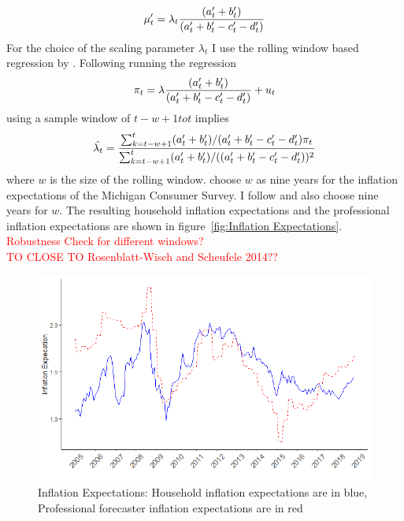 \documentclass[review]{elsarticle}
\begin{document}
\begin{align*}
\mu_t\sp{\prime} = \lambda_t \frac{(a_t\sp{\prime} + b_t\sp{\prime})}{(a_t\sp{\prime} + b_t\sp{\prime} - c_t\sp{\prime} - d_t\sp{\prime})}
\end{align*}
For the choice of the scaling parameter $\lambda_t$ I use the rolling window based regression by \cite{Lahiri2015}. Following \cite{Rosenblatt-Wisch2015} running the regression
\begin{align*}
\pi_t = \lambda \frac{(a_t\sp{\prime} + b_t\sp{\prime})}{(a_t\sp{\prime} + b_t\sp{\prime} - c_t\sp{\prime} - d_t\sp{\prime})} + u_t 
\end{align*}
using a sample window of $t - w + 1 to t$ implies
\begin{align*}
\hat{\lambda_t} = \frac{\sum^t_{k = t-w+1}(a_t\sp{\prime} + b_t\sp{\prime})/(a_t\sp{\prime} + b_t\sp{\prime} - c_t\sp{\prime} - d_t\sp{\prime})\pi_t}{\sum^t_{k = t-w+1}(a_t\sp{\prime} + b_t\sp{\prime})/((a_t\sp{\prime} + b_t\sp{\prime} - c_t\sp{\prime} - d_t\sp{\prime}))^2}
\end{align*}
where $w$ is the size of the rolling window. \cite{Lahiri2015} choose $w$ as nine years for the inflation expectations of the Michigan Consumer Survey. I follow \cite{Lahiri2015} and also choose nine years for $w$. The resulting household inflation expectations and the professional inflation expectations are shown in figure~\ref{fig:Inflation Expectations}.
\\
\textcolor{red}{Robustness Check for different windows?}
\\
\textcolor{red}{TO CLOSE TO Rosenblatt-Wisch and Scheufele 2014??}

  \begin{figure}[!ht]
    \centering
    \includegraphics{household_prof_inf.png}
    \caption{Inflation Expectations: Household inflation expectations are in blue, Professional forecaster inflation expectations are in red}
    \end{figure}
\label{fig:Inflation Expectations}
\end{document}
